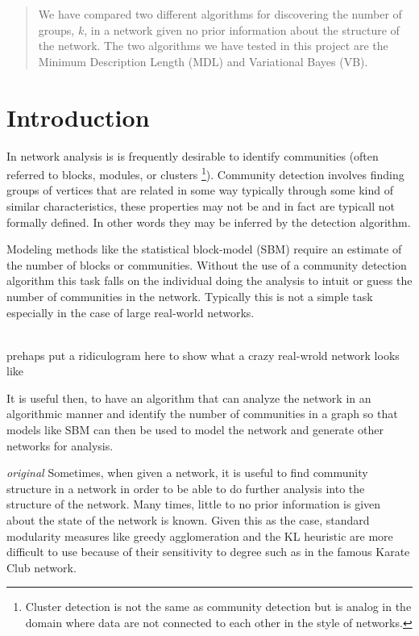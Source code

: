 \documentclass[twocolumn,twoside]{IEEEtran}
\author{Brett Israelsen \& Joshua Rahm}
\begin{document}
\maketitle

\begin{abstract}
We have compared two different algorithms for discovering
the number of groups, $k$, in a network given no prior information about the
structure of the network. The two algorithms we have tested in this project are
the Minimum Description Length (MDL) and Variational Bayes (VB).
\end{abstract}

\section*{Introduction}\label{sec:Intro}
In network analysis is is frequently desirable to identify communities (often referred to blocks, modules, or clusters \footnote{Cluster detection is not the same as community detection but is analog in the domain where data are not connected to each other in the style of networks.}). Community detection involves finding groups of vertices that are related in some way typically through some kind of similar characteristics, these properties may not be and in fact are typicall not formally defined. In
other words they may be inferred by the detection algorithm.

Modeling methods like the statistical block-model (SBM) require an estimate of the number of blocks or communities. Without the use of a community detection algorithm this task falls on the individual doing the analysis to intuit or guess the number of communities in the network. Typically this is not a simple task especially in the case of large real-world networks.

\\prehaps put a ridiculogram here to show what a crazy real-wrold network looks like

It is useful then, to have an algorithm that can analyze the network in an algorithmic manner and identify the number of communities in a graph so that models like SBM can then be used to model the network and generate other networks for analysis.

\emph{original}
Sometimes, when given a network, it is useful to find community structure in a
network in order to be able to do further analysis into the structure of the
network. Many times, little to no prior information is given about the state of
the network is known. Given this as the case, standard modularity measures like
greedy agglomeration and the KL heuristic are more difficult to use because of their
sensitivity to degree such as in the famous Karate Club network.
\end{document}

